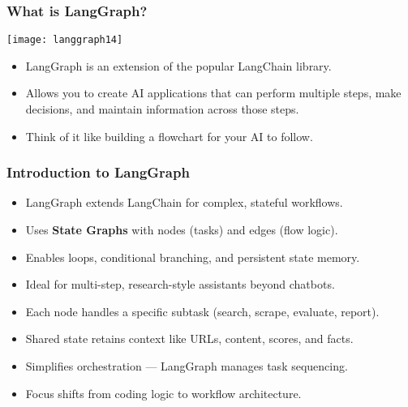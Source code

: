 \begin{frame}[fragile]\frametitle{What is LangGraph?}

\begin{center}
\texttt{[image: langgraph14]}
\end{center}


      \begin{itemize}
        \item LangGraph is an extension of the popular LangChain library. 
		\item Allows you to create AI applications that can perform multiple steps, make decisions, and maintain information across those steps. 
		\item Think of it like building a flowchart for your AI to follow.
      \end{itemize}
 
\end{frame}


\begin{frame}[fragile]\frametitle{Introduction to LangGraph}
    \begin{itemize}
        \item LangGraph extends LangChain for complex, stateful workflows.
        \item Uses \textbf{State Graphs} with nodes (tasks) and edges (flow logic).
        \item Enables loops, conditional branching, and persistent state memory.
        \item Ideal for multi-step, research-style assistants beyond chatbots.
        \item Each node handles a specific subtask (search, scrape, evaluate, report).
        \item Shared state retains context like URLs, content, scores, and facts.
        \item Simplifies orchestration — LangGraph manages task sequencing.
        \item Focus shifts from coding logic to workflow architecture.
    \end{itemize}
\end{frame}

